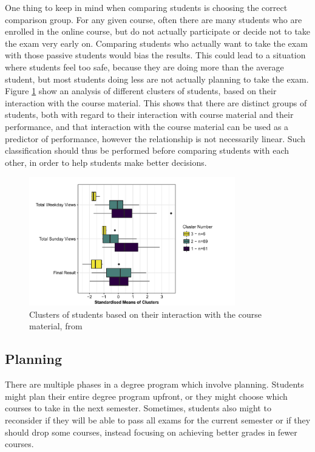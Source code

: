One thing to keep in mind when comparing students is choosing the correct comparison group.
For any given course, often there are many students who are enrolled in the online course, but do not actually participate or decide not to take the exam very early on.
Comparing students who actually want to take the exam with those passive students would bias the results. This could lead to a situation where students feel too safe, because they are doing more than the average student, but most students doing less are not actually planning to take the exam.
Figure \ref{fig:comp_clusters} show an analysis of different clusters of students, based on their interaction with the course material. This shows that there are distinct groups of students, both with regard to their interaction with course material and their performance, and that interaction with the course material can be used as a predictor of performance, however the relationship is not necessarily linear.
Such classification should thus be performed before comparing students with each other, in order to help students make better decisions.

\begin{figure}
    \centering
    \includegraphics[width=0.8\textwidth]{figures/comp_clusters.png}
    \caption{Clusters of students based on their interaction with the course material, from \cite{PredictionMethods-EarlyWarning}}
    \label{fig:comp_clusters}
\end{figure}

\subsection{Planning}
\label{subsec:planning}

There are multiple phases in a degree program which involve planning. Students might plan their entire degree program upfront, or they might choose which courses to take in the next semester.
Sometimes, students also might to reconsider if they will be able to pass all exams for the current semester or if they should drop some courses, instead focusing on achieving better grades in fewer courses.

